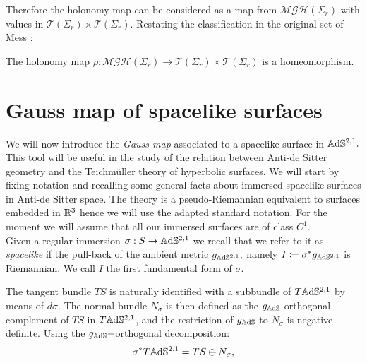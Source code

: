 Therefore the holonomy map can be considered as a map from $ \mathcal{MGH}(\Sigma_r)$ with values in $\mathcal{T}(\Sigma_r)\times\mathcal{T}(\Sigma_r).$ Restating the classification in the original set of Mess \cite{Mess}: 
\begin{theorem}\label{554}
    The holonomy map $\rho:\mathcal{MGH}(\Sigma_r)\to\mathcal{T}(\Sigma_r)\times\mathcal{T}(\Sigma_r)$ is a homeomorphism.
\end{theorem}
\section{Gauss map of spacelike surfaces}
    We will now introduce the \textit{Gauss map} associated to a spacelike surface in $\mathbb{A}\mathrm{d}\mathbb{S}^{2,1}.$ This tool will be useful in the study of the relation between Anti-de Sitter geometry and the Teichm\"uller theory of hyperbolic surfaces.
\noindent We will start by fixing notation and recalling some general facts about immersed spacelike surfaces in Anti-de Sitter space. The theory is a pseudo-Riemannian equivalent to surfaces embedded in $\mathbb{R}^3$ hence we will use the adapted standard notation. For the moment we will assume that all our immersed surfaces are of class $C^1$. \\
    Given a regular immersion $\sigma: S\to\mathbb{A}\mathrm{d}\mathbb{S}^{2,1}$ we recall that we refer to it as \textit{spacelike} if the pull-back of the ambient metric $g_{\mathbb{A}\mathrm{d}\mathbb{S}^{2,1}},$ namely $I\coloneqq\sigma^*g_{\mathbb{A}\mathrm{d}\mathbb{S}^{2,1}}$ is Riemannian. We call $I$ the first fundamental form of $\sigma$. 

The tangent bundle $TS$ is naturally identified with a subbundle of $T\mathbb{A}\mathrm{d}\mathbb{S}^{2,1}$ by means of $d\sigma$. The normal bundle $N_\sigma$ is then defined as the $g_{\mathbb{A}\mathrm{d}\mathbb{S}}$-orthogonal complement of $TS$ in $T\mathbb{A}\mathrm{d}\mathbb{S}^{2,1}$, and the restriction of $g_{\mathbb{A}\mathrm{d}\mathbb{S}}$ to $N_\sigma$ is negative definite. Using the $g_{\mathbb{A}\mathrm{d}\mathbb{S}}-$orthogonal  decomposition: 
\[
\sigma^*T\mathbb{A}\mathrm{d}\mathbb{S}^{2,1}=TS\oplus N_\sigma,    
\]

